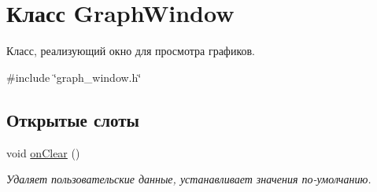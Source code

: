 \hypertarget{class_graph_window}{}\section{Класс Graph\+Window}
\label{class_graph_window}


Класс, реализующий окно для просмотра графиков.  




{\ttfamily \#include \char`\"{}graph\+\_\+window.\+h\char`\"{}}

\subsection*{Открытые слоты}
\begin{DoxyCompactItemize}
\item 
void \hyperlink{class_graph_window_a6f4268aa4bd0780c0016ed6bb74253d3}{on\+Clear} ()\hypertarget{class_graph_window_a6f4268aa4bd0780c0016ed6bb74253d3}{}\label{class_graph_window_a6f4268aa4bd0780c0016ed6bb74253d3}

\begin{DoxyCompactList}\small\item\em Удаляет пользовательские данные, устанавливает значения по-\/умолчанию. \end{DoxyCompactList}\end{DoxyCompactItemize}
